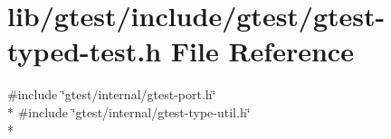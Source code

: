 \hypertarget{gtest-typed-test_8h}{\section{lib/gtest/include/gtest/gtest-\/typed-\/test.h File Reference}
\label{gtest-typed-test_8h}
}
{\ttfamily \#include \char`\"{}gtest/internal/gtest-\/port.\-h\char`\"{}}\\*
{\ttfamily \#include \char`\"{}gtest/internal/gtest-\/type-\/util.\-h\char`\"{}}\\*
